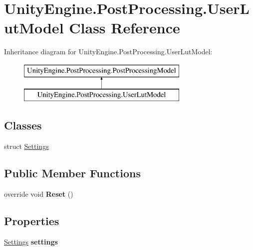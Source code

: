\hypertarget{class_unity_engine_1_1_post_processing_1_1_user_lut_model}{}\section{Unity\+Engine.\+Post\+Processing.\+User\+Lut\+Model Class Reference}
\label{class_unity_engine_1_1_post_processing_1_1_user_lut_model}
Inheritance diagram for Unity\+Engine.\+Post\+Processing.\+User\+Lut\+Model\+:\begin{figure}[H]
\begin{center}
\leavevmode
\includegraphics[height=2.000000cm]{class_unity_engine_1_1_post_processing_1_1_user_lut_model}
\end{center}
\end{figure}
\subsection*{Classes}
\begin{DoxyCompactItemize}
\item 
struct \hyperlink{struct_unity_engine_1_1_post_processing_1_1_user_lut_model_1_1_settings}{Settings}
\end{DoxyCompactItemize}
\subsection*{Public Member Functions}
\begin{DoxyCompactItemize}
\item 
\mbox{\label{class_unity_engine_1_1_post_processing_1_1_user_lut_model_af9a480ba07bbcd8c4863610c30e2e1f7}} 
override void {\bfseries Reset} ()
\end{DoxyCompactItemize}
\subsection*{Properties}
\begin{DoxyCompactItemize}
\item 
\mbox{\label{class_unity_engine_1_1_post_processing_1_1_user_lut_model_a0fb6df59627b12d97cf28efb64ae8033}} 
\hyperlink{struct_unity_engine_1_1_post_processing_1_1_user_lut_model_1_1_settings}{Settings} {\bfseries settings}
\end{DoxyCompactItemize}
